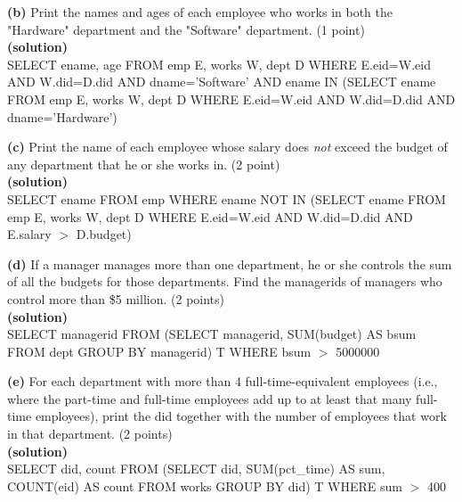 \documentclass[11pt]{article}
\renewcommand\part[1]{\vspace{.10in}\textbf{(#1)}}
\begin{document}
\part{b} Print the names and ages of each employee who works in both the "Hardware" department and the "Software" department. (1 point)\\
\part{solution}\\
SELECT ename, age FROM emp E, works W, dept D WHERE E.eid=W.eid AND W.did=D.did AND dname='Software' AND ename IN (SELECT ename FROM emp E, works W, dept D WHERE E.eid=W.eid AND W.did=D.did AND dname='Hardware')

\part{c} Print the name of each employee whose salary does {\it not} exceed the budget of any department that he or she works in. (2 point)\\
\part{solution}\\
SELECT ename FROM emp WHERE ename NOT IN (SELECT ename FROM emp E, works W, dept D WHERE E.eid=W.eid AND W.did=D.did AND E.salary $>$ D.budget)

\part{d} If a manager manages more than one department, he or she controls the sum of all the budgets for those departments. Find the managerids of managers who control more than \$5 million. (2 points)\\
\part{solution}\\
SELECT managerid FROM (SELECT managerid, SUM(budget) AS bsum FROM dept GROUP BY managerid) T WHERE bsum $>$ 5000000

\part{e} For each department with more than 4 full-time-equivalent employees (i.e., where the part-time and full-time employees add up to at least that many full-time employees), print the did together with the number of employees that work in that department. (2 points)\\
\part{solution}\\
SELECT did, count FROM (SELECT did, SUM(pct\_time) AS sum, COUNT(eid) AS count FROM works GROUP BY did) T WHERE sum $>$ 400
\end{document}
